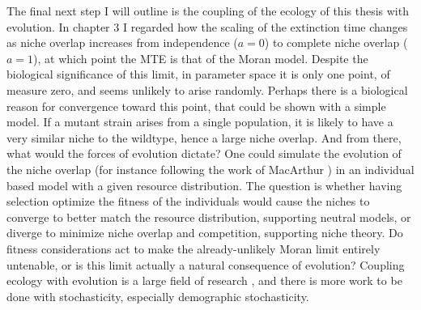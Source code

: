 The final next step I will outline is the coupling of the ecology of this thesis with evolution. 
In chapter 3 I regarded how the scaling of the extinction time changes as niche overlap increases from independence ($a=0$) to complete niche overlap ($a=1$), at which point the MTE is that of the Moran model. 
Despite the biological significance of this limit, in parameter space it is only one point, of measure zero, and seems unlikely to arise randomly. 
Perhaps there is a biological reason for convergence toward this point, that could be shown with a simple model. %
If a mutant strain arises from a single population, it is likely to have a very similar niche to the wildtype, hence a large niche overlap. 
And from there, what would the forces of evolution dictate? 
One could simulate the evolution of the niche overlap (for instance following the work of MacArthur \cite{MacArthur1957}) in an individual based model with a given resource distribution. 
The question is whether having selection optimize the fitness of the individuals would cause the niches to converge to better match the resource distribution, supporting neutral models, or diverge to minimize niche overlap and competition, supporting niche theory. 
Do fitness considerations act to make the already-unlikely Moran limit entirely untenable, or is this limit actually a natural consequence of evolution? 
Coupling ecology with evolution is a large field of research \cite{MacArthur1967,Shoener1974,Connell1980,Abrams1983,Lenski1991,Leibold1995,Peterson1997,May1999,Chesson2000,Traulsen2006,Desai2007,Xavier2007,Mayfield2010,Parsons2010,Lin2012,Jensen2014,Chotibut2015,Constable2015,Kessler2015,Castro2016,Posfai2017}, and there is more work to be done with stochasticity, especially demographic stochasticity. %

